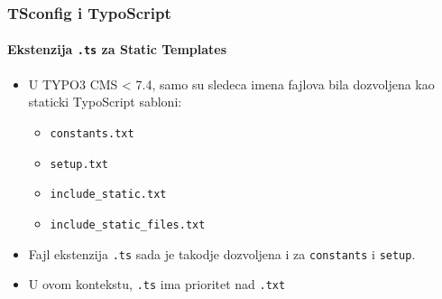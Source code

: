 
\begin{frame}[fragile]
	\frametitle{TSconfig i TypoScript}
	\framesubtitle{Ekstenzija \texttt{.ts} za Static Templates}

	\begin{itemize}

		\item U TYPO3 CMS < 7.4, samo su sledeca imena fajlova bila dozvoljena kao staticki TypoScript sabloni:

			\begin{itemize}
				\item \texttt{constants.txt}
				\item \texttt{setup.txt}
				\item \texttt{include\_static.txt}
				\item \texttt{include\_static\_files.txt}
			\end{itemize}

		\item Fajl ekstenzija \texttt{.ts} sada je takodje dozvoljena i za \texttt{constants} i \texttt{setup}.

		\item U ovom kontekstu, \texttt{.ts} ima prioritet nad \texttt{.txt}

	\end{itemize}

\end{frame}


